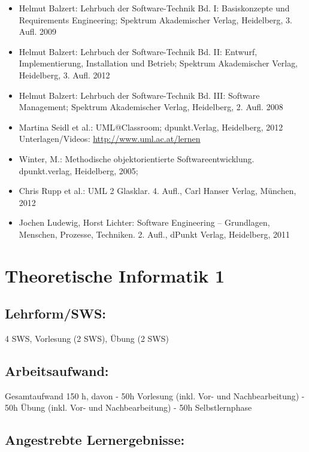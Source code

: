 \begin{itemize}
\tightlist
\item
  Helmut Balzert: Lehrbuch der Software-Technik Bd. I: Basiskonzepte und
  Requirements Engineering; Spektrum Akademischer Verlag, Heidelberg, 3.
  Aufl. 2009
\item
  Helmut Balzert: Lehrbuch der Software-Technik Bd. II: Entwurf,
  Implementierung, Installation und Betrieb; Spektrum Akademischer
  Verlag, Heidelberg, 3. Aufl. 2012
\item
  Helmut Balzert: Lehrbuch der Software-Technik Bd. III: Software
  Management; Spektrum Akademischer Verlag, Heidelberg, 2. Aufl. 2008
\item
  Martina Seidl et al.: UML@Classroom; dpunkt.Verlag, Heidelberg, 2012
  Unterlagen/Videos: \url{http://www.uml.ac.at/lernen}
\item
  Winter, M.: Methodische objektorientierte Softwareentwicklung.
  dpunkt.verlag, Heidelberg, 2005;
\item
  Chris Rupp et al.: UML 2 Glasklar. 4. Aufl., Carl Hanser Verlag,
  München, 2012
\item
  Jochen Ludewig, Horst Lichter: Software Engineering -- Grundlagen,
  Menschen, Prozesse, Techniken. 2. Aufl., dPunkt Verlag, Heidelberg,
  2011
\end{itemize}

\chapter{Theoretische Informatik 1}\label{theoretische-informatik-1}

\section{Lehrform/SWS:}\label{lehrformsws-22}

4 SWS, Vorlesung (2 SWS), Übung (2 SWS)

\section{Arbeitsaufwand:}\label{arbeitsaufwand-22}

Gesamtaufwand 150 h, davon - 50h Vorlesung (inkl. Vor- und
Nachbearbeitung) - 50h Übung (inkl. Vor- und Nachbearbeitung) - 50h
Selbstlernphase

\section{Angestrebte
Lernergebnisse:}\label{angestrebte-lernergebnisse-27}

